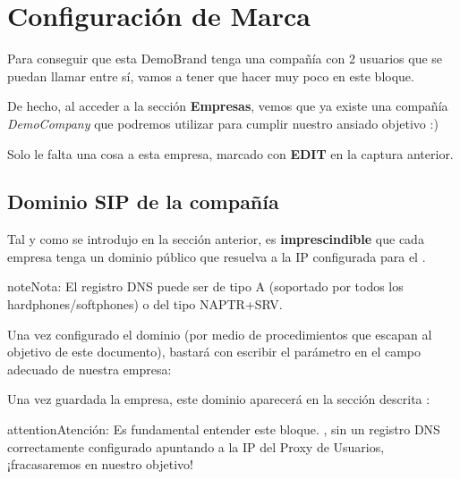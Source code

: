 \documentclass[letterpaper,10pt,spanish]{sphinxmanual}
\begin{document}
\section{Configuración de Marca}
\label{internal_calls/brand_portal::doc}\label{internal_calls/brand_portal:brand-configuration}
Para conseguir que esta DemoBrand tenga una compañía con 2 usuarios que se puedan llamar entre sí, vamos a tener que hacer muy poco en este bloque.

De hecho, al acceder a la sección \textbf{Empresas}, vemos que ya existe una compañía \emph{DemoCompany} que podremos utilizar para cumplir nuestro ansiado objetivo :)

\noindent{}

Solo le falta una cosa a esta empresa, marcado con \textbf{EDIT} en la captura anterior.


\subsection{Dominio SIP de la compañía}
\label{internal_calls/brand_portal:company-sip-domain}\label{internal_calls/brand_portal:domain-per-company}
Tal y como se introdujo en la sección anterior, es \textbf{imprescindible} que cada empresa tenga un dominio público que resuelva a la IP configurada para el {\hyperref[internal_calls/god_portal:proxyusers]{}}.

\begin{notice}{note}{Nota:}
El registro DNS puede ser de tipo A (soportado por todos los hardphones/softphones) o del tipo NAPTR+SRV.
\end{notice}

Una vez configurado el dominio (por medio de procedimientos que escapan al objetivo de este documento), bastará con escribir el parámetro en el campo adecuado de nuestra empresa:

\noindent{}

Una vez guardada la empresa, este dominio aparecerá en la sección descrita {\hyperref[internal_calls/god_portal:god\string-sipdomains]{}}:

\noindent{}

\begin{notice}{attention}{Atención:}
Es fundamental entender este bloque. {\hyperref[internal_calls/brand_portal:dnshack]{}}, sin un registro DNS correctamente configurado apuntando a la IP del Proxy de Usuarios, ¡fracasaremos en nuestro objetivo!
\end{notice}
\end{document}
